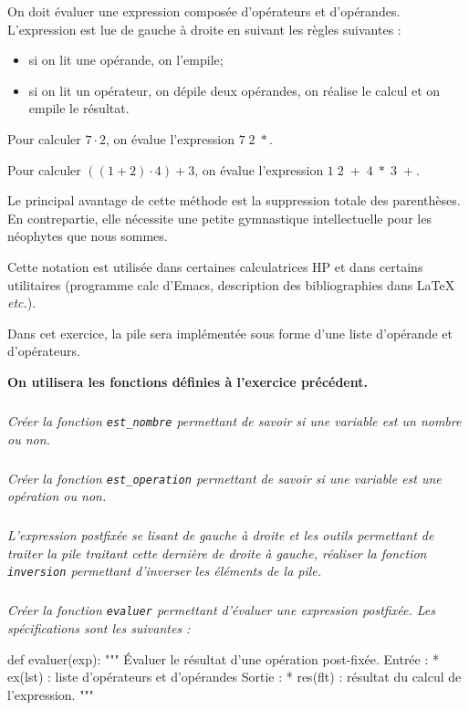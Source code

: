 On doit évaluer une expression composée d'opérateurs et d'opérandes. L'expression est lue de gauche à droite en suivant les règles suivantes :
\begin{itemize}
\item si on lit une opérande, on l'empile;
\item si on lit un opérateur, on dépile deux opérandes, on réalise le calcul et on empile le résultat. 
\end{itemize}
\begin{exemple}
Pour calculer $7\cdot 2$, on évalue l'expression $7\;2\; *$.

Pour calculer $((1 + 2) \cdot 4) + 3$, on évalue l'expression $1\;2\;+\;4\;*\;3\;+$.
\end{exemple} 


\begin{rem}
Le principal avantage de cette méthode est la suppression totale des parenthèses. En contrepartie, elle nécessite une petite gymnastique intellectuelle pour les néophytes que nous sommes.

Cette notation est utilisée dans certaines calculatrices HP et dans certains utilitaires (programme calc d'Emacs, description des bibliographies dans LaTeX \textit{etc.}).
\end{rem}

Dans cet exercice, la pile sera implémentée sous forme d'une liste d'opérande et d'opérateurs. 

\textbf{On utilisera les fonctions définies à l'exercice précédent.}
 
\subparagraph{}\textit{Créer la fonction \texttt{est\_nombre} permettant de savoir si une variable est un nombre ou non.}

\subparagraph{}\textit{Créer la fonction \texttt{est\_operation} permettant de savoir si une variable est une opération ou non.}

\subparagraph{}\textit{L'expression postfixée se lisant de gauche à droite et les outils permettant de traiter la pile traitant cette dernière de droite à gauche, réaliser la fonction \texttt{inversion} permettant d'inverser les éléments de la pile.}


\subparagraph{}\textit{Créer la fonction \texttt{evaluer} permettant d'évaluer une expression postfixée. Les spécifications sont les suivantes :}

\begin{py}
\begin{python}
def evaluer(exp):
    """
    Évaluer le résultat d'une opération post-fixée.
    Entrée : 
     * ex(lst) : liste d'opérateurs et d'opérandes
    Sortie : 
     * res(flt) : résultat du calcul de l'expression.
    """
\end{python}
\end{py}

